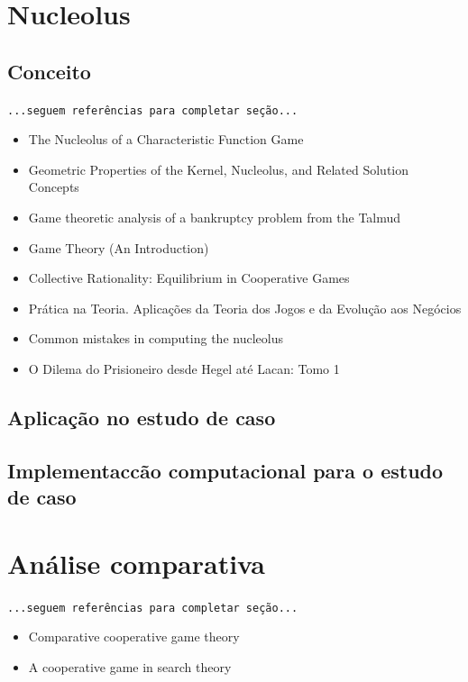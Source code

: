 \documentclass[
	article,			        %
	11pt,				          %
	oneside,			        %
	a4paper,			        %
	english,			        %
	brazil,				        %
	sumario=tradicional
]{abntex2}\usepackage[]{graphicx}\usepackage[]{color}
\begin{document}
\section{Nucleolus}

\subsection{Conceito}

  \texttt{\color{red}...seguem referências para completar seção...}
  \begin{itemize}
    \item The Nucleolus of a Characteristic Function Game \cite{Schmeidler.1969}
    \item Geometric Properties of the Kernel, Nucleolus, and Related Solution Concepts \cite{Maschler.1979}
    \item Game theoretic analysis of a bankruptcy problem from the Talmud \cite{Aumann.1985}
    \item Game Theory (An Introduction) \cite[p.~219--307]{Barron.2007}
    \item Collective Rationality: Equilibrium in Cooperative Games \cite{Weirich.2009}
    \item Prática na Teoria. Aplicações da Teoria dos Jogos e da Evolução aos Negócios \cite{Marinho.2011}
    \item Common mistakes in computing the nucleolus \cite{Guajardo.2015}
    \item O Dilema do Prisioneiro desde Hegel até Lacan: Tomo 1 \cite{Faveret.2015}
  \end{itemize}

\subsection{Aplicação no estudo de caso}

\subsection{Implementac{c}ão computacional para o estudo de caso}


\section{Análise comparativa}

  \texttt{\color{red}...seguem referências para completar seção...}
  \begin{itemize}
    \item Comparative cooperative game theory \cite{Ichiishi.1990}
    \item A cooperative game in search theory \cite{Hohzaki.2009}
  \end{itemize}
\end{document}
